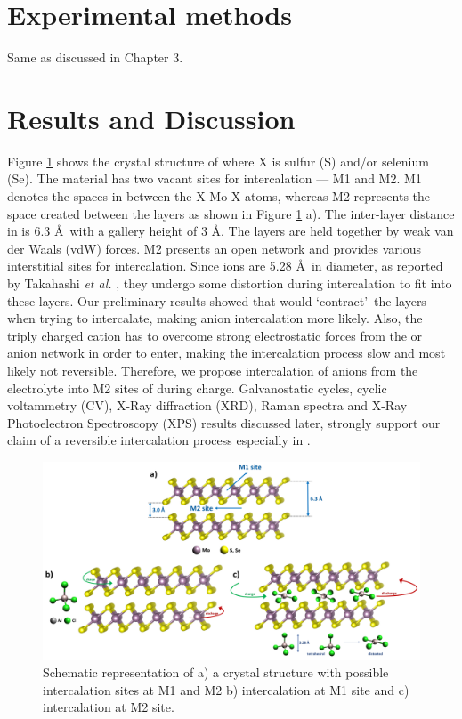 \section{Experimental methods}
Same as discussed in Chapter 3.

\section{Results and Discussion}
Figure \ref{Figures/chap4fig:S1} shows the crystal structure of  where X is sulfur (S) and/or selenium (Se). The material has two vacant sites for intercalation --- M1 and M2. M1 denotes the spaces in between the X-Mo-X atoms, whereas M2 represents the space created between the  layers as shown in Figure \ref{Figures/chap4fig:S1} a). The inter-layer distance in  is 6.3 \AA\ with a gallery height of 3 \AA. The layers are held together by weak van der Waals (vdW) forces. M2 presents an open network and provides various interstitial sites for intercalation. Since  ions are 5.28 \AA\ in diameter, as reported by Takahashi {\it et al.} \cite{takahashi_niv2o5nh2o_2005}, they undergo some distortion during intercalation to fit into these layers. Our preliminary results showed that  would \lq contract\rq\ the  layers when trying to intercalate, making  anion intercalation more likely. Also, the triply charged  cation has to overcome strong electrostatic forces from the  or  anion network in order to enter, making the intercalation process slow and most likely not reversible. Therefore, we propose intercalation of  anions from the electrolyte into M2 sites of  during charge. Galvanostatic cycles, cyclic voltammetry (CV), X-Ray diffraction (XRD), Raman spectra and X-Ray Photoelectron Spectroscopy (XPS) results discussed later, strongly support our claim of a reversible intercalation process especially in .

\begin{figure}
  \centering
  \includegraphics[width=\textwidth]{Figures/chap4fig/S1}
  \caption{Schematic representation of a) a  crystal structure with possible intercalation sites at M1 and M2 b) intercalation at M1 site and c) intercalation at M2 site.}
  \label{Figures/chap4fig:S1}
\end{figure}

